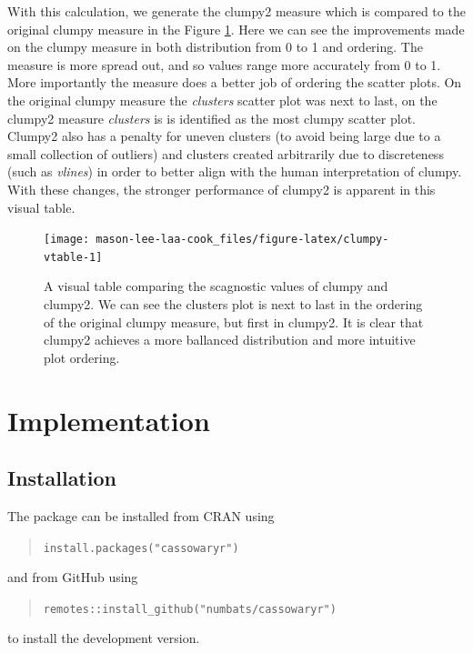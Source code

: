 With this calculation, we generate the clumpy2 measure which is compared to the original clumpy measure in the Figure \ref{fig:clumpy-vtable}. Here we can see the improvements made on the clumpy measure in both distribution from 0 to 1 and ordering. The measure is more spread out, and so values range more accurately from 0 to 1. More importantly the measure does a better job of ordering the scatter plots. On the original clumpy measure the \emph{clusters} scatter plot was next to last, on the clumpy2 measure \emph{clusters} is is identified as the most clumpy scatter plot. Clumpy2 also has a penalty for uneven clusters (to avoid being large due to a small collection of outliers) and clusters created arbitrarily due to discreteness (such as \emph{vlines}) in order to better align with the human interpretation of clumpy. With these changes, the stronger performance of clumpy2 is apparent in this visual table.

\begin{figure}
\texttt{[image: mason-lee-laa-cook\_files/figure-latex/clumpy-vtable-1]} \caption{A visual table comparing the scagnostic values of clumpy and clumpy2. We can see the clusters plot is next to last in the ordering of the original clumpy measure, but first in clumpy2. It is clear that clumpy2 achieves a more ballanced distribution and more intuitive plot ordering.}\label{fig:clumpy-vtable}
\end{figure}

\hypertarget{implementation}{%
\section{Implementation}\label{implementation}}

\hypertarget{installation}{%
\subsection{Installation}\label{installation}}

The package can be installed from CRAN using

\begin{quote}
\texttt{install.packages("cassowaryr")}
\end{quote}

and from GitHub using

\begin{quote}
\texttt{remotes::install\_github("numbats/cassowaryr")}
\end{quote}

to install the development version.

